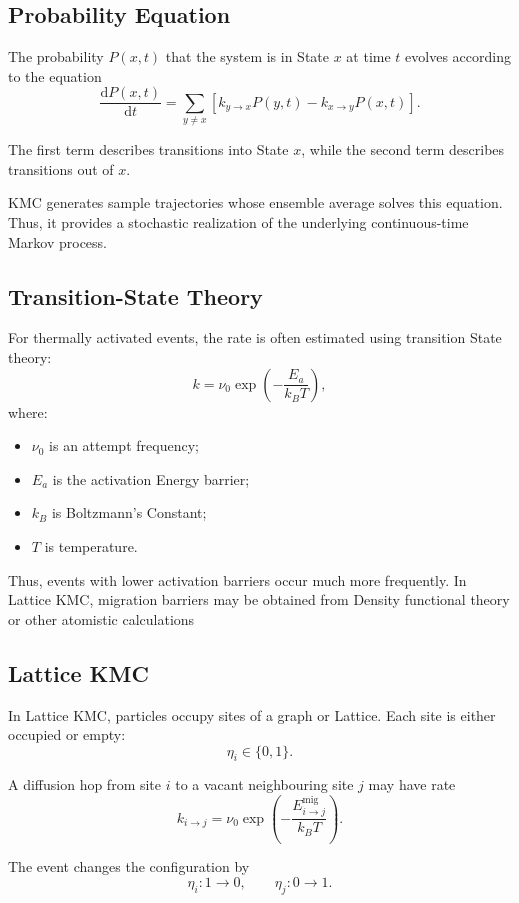 \documentclass[a4paper, 10pt, onepage]{elegantbook}
\begin{document}
{\subsection{Probability Equation}

The probability \(P(x,t)\) that the system is in State \(x\) at time \(t\)
evolves according to the equation
\[
\frac{\mathrm dP(x,t)}{\mathrm dt}
=
\sum_{y\ne x}
\left[
k_{y\to x}P(y,t)
-
k_{x\to y}P(x,t)
\right].
\]

The first term describes transitions into State \(x\), while the second term
describes transitions out of \(x\).

KMC generates sample trajectories whose ensemble average solves this
equation. Thus, it provides a stochastic realization of the underlying
continuous-time Markov process.

\subsection{Transition-State Theory}

For thermally activated events, the rate is often estimated using transition
State theory:
\[
k
=
\nu_0
\exp\left(-\frac{E_a}{k_BT}\right),
\]
where:

\begin{itemize}
\item \(\nu_0\) is an attempt frequency;
\item \(E_a\) is the activation Energy barrier;
\item \(k_B\) is Boltzmann's Constant;
\item \(T\) is temperature.
\end{itemize}

Thus, events with lower activation barriers occur much more frequently. In
Lattice KMC, migration barriers may be obtained from Density functional theory
or other atomistic calculations

\subsection{Lattice KMC}

In Lattice KMC, particles occupy sites of a graph or Lattice. Each site is
either occupied or empty:
\[
\eta_i\in\{0,1\}.
\]

A diffusion hop from site \(i\) to a vacant neighbouring site \(j\) may have
rate
\[
k_{i\to j}
=
\nu_0
\exp\left(
-\frac{E_{i\to j}^{\mathrm{mig}}}{k_BT}
\right).
\]

The event changes the configuration by
\[
\eta_i:1\to0,
\qquad
\eta_j:0\to1.
\]

}
\end{document}
